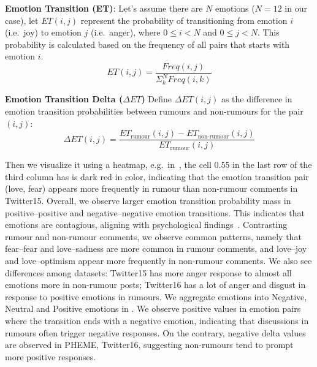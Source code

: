 \textbf{Emotion Transition (ET)}: Let's assume there are $N$ emotions ($N=12$ in our case), let $ET(i, j)$ represent the probability of transitioning from emotion $i$ (i.e.\ joy) to emotion $j$ (i.e.\ anger), where $0\leq i< N$ and $0\leq j< N$. This probability is calculated based on the frequency of all pairs that starts with emotion $i$.
\begin{equation}
    ET(i, j) = \frac{Freq(i, j)}{\Sigma_{k}^{N}Freq(i, k)}
\end{equation}

\textbf{Emotion Transition Delta ($\Delta ET$)} Define $\Delta ET(i, j)$ as the difference in emotion transition probabilities between rumours and non-rumours for the pair $(i, j)$:
\begin{equation}
    \Delta ET(i, j) = \frac{ET_\text{rumour}(i, j) - ET_\text{non-rumour}(i, j)}{ET_\text{rumour}(i, j)}
\end{equation}

Then we visualize it using a heatmap, e.g.\ in~, the cell 0.55 in the last row of the third column has is dark red in color, indicating that the emotion transition pair (love, fear) appears more frequently in rumour than non-rumour comments in Twitter15. Overall, we observe larger emotion transition probability mass in positive--positive and negative--negative emotion transitions. This indicates that emotions are contagious, aligning with psychological findings~\citep{Goldenberg2019DigitalEC, Herrando2021EmotionalCA}. Contrasting rumour and non-rumour comments, we observe common patterns, namely that fear--fear and love--sadness are more common in rumour comments, and love--joy and love--optimism appear more frequently in non-rumour comments. We also see differences among datasets: Twitter15 has more anger response to almost all emotions more in non-rumour posts; Twitter16 has a lot of anger and disgust in response to positive emotions in rumours. We aggregate emotions into Negative, Neutral and Positive emotions in . We observe positive values in emotion pairs where the transition ends with a negative emotion, indicating that discussions in rumours often trigger negative responses. On the contrary, negative delta values are observed in PHEME, Twitter16, suggesting non-rumours tend to prompt more positive responses.


